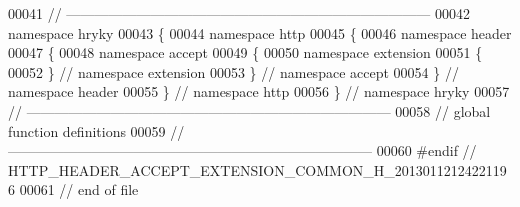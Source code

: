 \begin{DoxyCode}
00041 \textcolor{comment}{//
      ------------------------------------------------------------------------------}
00042 \textcolor{keyword}{namespace }hryky
00043 \{
00044 \textcolor{keyword}{namespace }http
00045 \{
00046 \textcolor{keyword}{namespace }header
00047 \{
00048 \textcolor{keyword}{namespace }accept
00049 \{
00050 \textcolor{keyword}{namespace }extension
00051 \{
00052 \} \textcolor{comment}{// namespace extension}
00053 \} \textcolor{comment}{// namespace accept}
00054 \} \textcolor{comment}{// namespace header}
00055 \} \textcolor{comment}{// namespace http}
00056 \} \textcolor{comment}{// namespace hryky}
00057 \textcolor{comment}{//
      ------------------------------------------------------------------------------}
00058 \textcolor{comment}{// global function definitions}
00059 \textcolor{comment}{//
      ------------------------------------------------------------------------------}
00060 \textcolor{preprocessor}{#endif // HTTP\_HEADER\_ACCEPT\_EXTENSION\_COMMON\_H\_20130112124221196}
00061 \textcolor{preprocessor}{}\textcolor{comment}{// end of file}
\end{DoxyCode}
